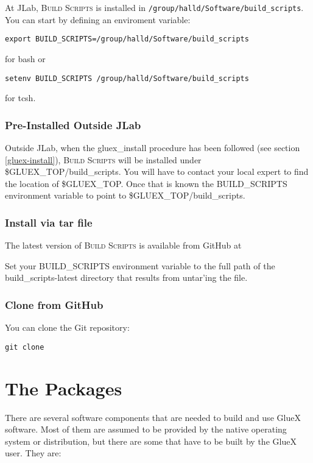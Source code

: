 \documentclass[12pt]{article}
\newcommand{\bs}{\textsc{Build Scripts}}
\newcommand{\bcenter}{\begin{center}}
\newcommand{\ecenter}{\end{center}}
\begin{document}
At JLab, \bs{} is installed in {\tt /group/halld/Software/build\_scripts}. You can start by defining an enviroment variable:
\begin{center}
{\tt export BUILD\_SCRIPTS=/group/halld/Software/build\_scripts}
\end{center}
for bash or
\begin{center}
{\tt setenv BUILD\_SCRIPTS\ /group/halld/Software/build\_scripts}
\end{center}
for tcsh.

\subsubsection{Pre-Installed Outside JLab}

Outside JLab, when the gluex\_install procedure has been followed (see section \ref{gluex-install}), \bs{} will be installed under \$GLUEX\_TOP/build\_scripts. You will have to contact your local expert to find the location of \$GLUEX\_TOP. Once that is known the BUILD\_SCRIPTS environment variable to point to \$GLUEX\_TOP/build\_scripts.

\subsubsection{Install via tar file}

The latest version of \bs{} is available from GitHub at
\bcenter
{}
\ecenter
Set your BUILD\_SCRIPTS environment variable to the full path of the build\_scripts-latest directory that results from untar'ing the file.

\subsubsection{Clone from GitHub}

You can clone the Git repository:
\bcenter
  {\tt git clone }
\ecenter

\section{The Packages}

There are several software components that are needed to build and use
GlueX software. Most of them are assumed to be provided by the native
operating system or distribution, but there are some that have to be
built by the GlueX user. They are:
\end{document}
